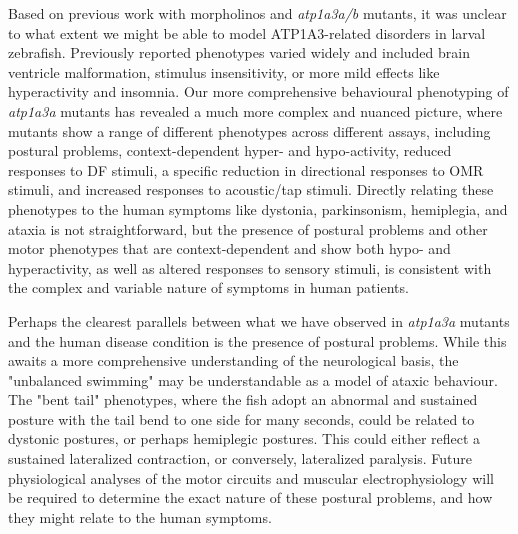 \documentclass[9.5pt,lineno]{RandlettLab_elife}
\begin{document}
Based on previous work with morpholinos and \emph{atp1a3a/b} mutants, it was unclear to what extent we might be able to model ATP1A3-related disorders in larval zebrafish.
Previously reported phenotypes varied widely and included brain ventricle malformation, stimulus insensitivity, or more mild effects like hyperactivity and insomnia. 
Our more comprehensive behavioural phenotyping of \emph{atp1a3a} mutants has revealed a much more complex and nuanced picture, where mutants show a range of different phenotypes across different assays, including postural problems, context-dependent hyper- and hypo-activity, reduced responses to DF stimuli, a specific reduction in directional responses to OMR stimuli, and increased responses to acoustic/tap stimuli.
Directly relating these phenotypes to the human symptoms like dystonia, parkinsonism, hemiplegia, and ataxia is not straightforward, but the presence of postural problems and other motor phenotypes that are context-dependent and show both hypo- and hyperactivity, as well as altered responses to sensory stimuli, is consistent with the complex and variable nature of symptoms in human patients.

Perhaps the clearest parallels between what we have observed in \emph{atp1a3a} mutants and the human disease condition is the presence of postural problems.
While this awaits a more comprehensive understanding of the neurological basis, the "unbalanced swimming" may be understandable as a model of ataxic behaviour.
The "bent tail" phenotypes, where the fish adopt an abnormal and sustained posture with the tail bend to one side for many seconds, could be related to dystonic postures, or perhaps hemiplegic postures.
This could either reflect a sustained lateralized contraction, or conversely, lateralized paralysis.
Future physiological analyses of the motor circuits and muscular electrophysiology will be required to determine the exact nature of these postural problems, and how they might relate to the human symptoms.
\end{document}
